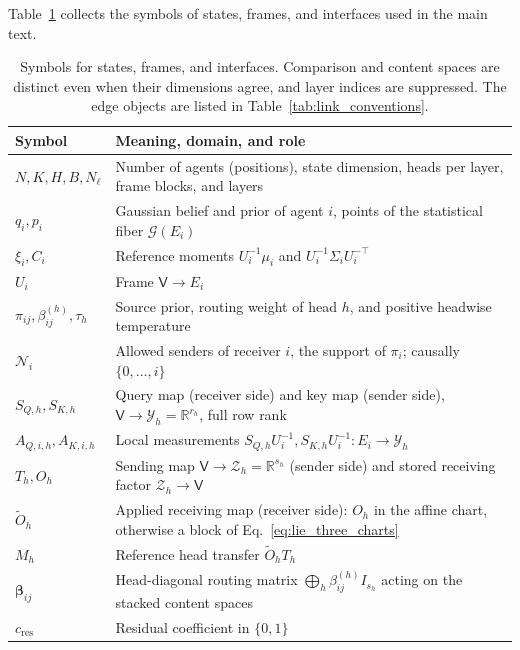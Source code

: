 \documentclass[twoside,11pt]{article}
\begin{document}
Table~\ref{tab:symbols} collects the symbols of states, frames, and interfaces used in the main text.

\begin{table}[!htb]
\centering
\small
\renewcommand{\arraystretch}{1.12}
\begin{tabularx}{\textwidth}{@{}lX@{}}
\toprule
Symbol & Meaning, domain, and role \\
\midrule
$N,K,H,B,N_\ell$ & Number of agents (positions), state dimension, heads per layer, frame blocks, and layers \\
$q_i,p_i$ & Gaussian belief and prior of agent $i$, points of the statistical fiber $\mathcal G(E_i)$ \\
$\xi_i,C_i$ & Reference moments $U_i^{-1}\mu_i$ and $U_i^{-1}\Sigma_iU_i^{-\top}$ \\
$U_i$ & Frame $\mathsf V\to E_i$ \\
$\pi_{ij},\beta_{ij}^{(h)},\tau_h$ & Source prior, routing weight of head $h$, and positive headwise temperature \\
$\mathcal N_i$ & Allowed senders of receiver $i$, the support of $\pi_i$; causally $\{0,\ldots,i\}$ \\
$S_{Q,h},S_{K,h}$ & Query map (receiver side) and key map (sender side), $\mathsf V\to\mathcal Y_h=\mathbb R^{r_h}$, full row rank \\
$A_{Q,i,h},A_{K,i,h}$ & Local measurements $S_{Q,h}U_i^{-1},S_{K,h}U_i^{-1}:E_i\to\mathcal Y_h$ \\
$T_h,O_h$ & Sending map $\mathsf V\to\mathcal Z_h=\mathbb R^{s_h}$ (sender side) and stored receiving factor $\mathcal Z_h\to\mathsf V$ \\
$\widetilde O_h$ & Applied receiving map (receiver side): $O_h$ in the affine chart, otherwise a block of Eq.~\eqref{eq:lie_three_charts} \\
$M_h$ & Reference head transfer $\widetilde O_hT_h$ \\
$\boldsymbol\beta_{ij}$ & Head-diagonal routing matrix $\bigoplus_h\beta_{ij}^{(h)}I_{s_h}$ acting on the stacked content spaces \\
$c_{\mathrm{res}}$ & Residual coefficient in $\{0,1\}$ \\
\bottomrule
\end{tabularx}
\caption{Symbols for states, frames, and interfaces. Comparison and content spaces are distinct even when their dimensions agree, and layer indices are suppressed. The edge objects are listed in Table~\ref{tab:link_conventions}.}
\label{tab:symbols}
\end{table}
\end{document}

